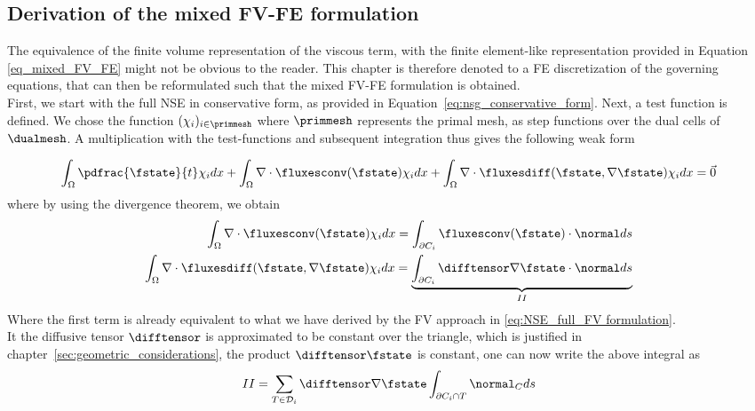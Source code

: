 \documentclass[../main.tex]{subfiles}
\begin{document}
\cleardoublepage
\subsection{Derivation of the mixed \ac{FV}-\ac{FE} formulation}\label{sec:viscous_term_treatment}
The equivalence of the finite volume representation of the viscous term, with the finite element-like representation provided in Equation \eqref{eq_mixed_FV_FE} might not be obvious to the reader. This chapter is therefore denoted to a \ac{FE} discretization of the governing equations, that can then be reformulated such that the mixed \ac{FV}-\ac{FE} formulation is obtained.\\
First, we start with the full \ac{NSE} in conservative form, as provided in Equation~\eqref{eq:nsg_conservative_form}. Next, a test function is defined. We chose the function $({\chi_i})_{i\in \primmesh}$ where $\primmesh$ represents the primal mesh, as step functions over the dual cells of $\dualmesh$.
A multiplication with the test-functions and subsequent integration thus gives the following weak form

\begin{align}\label{fv_weak_form_felike}
  \int_\Omega \pdfrac{\fstate}{t}\chi_i dx + \int_\Omega \nabla \cdot \fluxesconv(\fstate)\chi_i dx + \int_\Omega \nabla \cdot \fluxesdiff(\fstate,\nabla  \fstate)\chi_i dx = \vec{0}
\end{align}
where by using the divergence theorem, we obtain
\begin{align}\label{eq:divtheorem_felike}
  \int_\Omega \nabla \cdot \fluxesconv(\fstate)\chi_i dx = \int_{\partial C_i} \fluxesconv(\fstate)\cdot \normal ds \nonumber\\
  \int_\Omega \nabla \cdot \fluxesdiff(\fstate,\nabla \fstate)\chi_i dx = \underbrace{\int_{\partial C_i} \difftensor \nabla\fstate\cdot \normal ds}_{II}
\end{align}
Where the first term is already equivalent to what we have derived by the \ac{FV} approach in \eqref{eq:NSE_full_FV formulation}.\\



It the diffusive tensor $\difftensor$ is approximated to be constant over the triangle, which is justified in chapter~\ref{sec:geometric_considerations}, the product $\difftensor\fstate$ is constant, one can now write the above integral as
\begin{align}
II=\sum_{T \in \mathcal{D}_i} \difftensor \nabla\fstate\int_{\partial C_i \cap T} \normal_C ds
\end{align}
\end{document}
